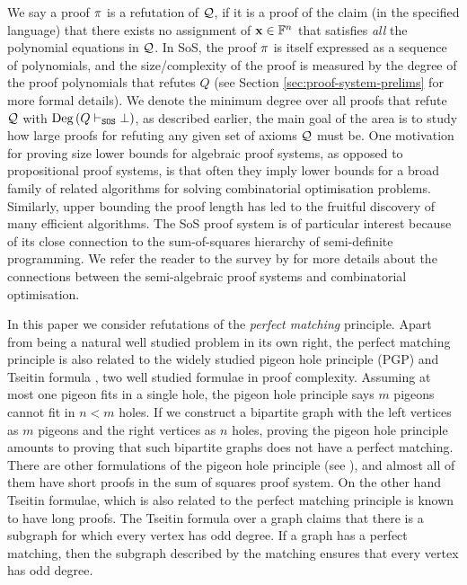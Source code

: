\documentclass[11pt]{article}
\begin{document}
We say a proof $\pi$ is a refutation of $\mathcal{Q}$, if it is a proof of the claim (in the specified language) that there exists no assignment of $\mathbf{x} \in \mathbb{F}^n$ that satisfies \emph{all} the polynomial equations in $\mathcal{Q}$.
In SoS, the proof $\pi$ is itself expressed as a sequence of polynomials, and the size/complexity of the proof is measured by the degree of the proof polynomials that refutes $Q$ (see Section \ref{sec:proof-system-prelims} for more formal details).
We denote the minimum degree over all proofs that refute $\mathcal{Q}$ with $\text{Deg}\left(Q \vdash_{\texttt{SOS}} \bot\right)$, as described earlier, the main goal of the area is to study how large proofs for refuting any given set of axioms $\mathcal{Q}$ must be.
One motivation for proving size lower bounds for algebraic proof systems, as opposed to propositional proof systems, is that often they imply lower bounds for a broad family of related algorithms for solving combinatorial optimisation problems.
Similarly, upper bounding the proof length has led to the fruitful discovery of many efficient algorithms.
The SoS proof system is of particular interest because of its close connection to the sum-of-squares hierarchy of semi-definite programming.
We refer the reader to the survey by \citet{fleming2019semialgebraic} for more details about the connections between the semi-algebraic proof systems and combinatorial optimisation.\par
In this paper we consider refutations of the \emph{perfect matching} principle.
Apart from being a natural well studied problem in its own right, the perfect matching principle is also related to the widely studied pigeon hole principle (PGP) \citep{razbarov2002pgp} and Tseitin formula \citep{grigoriev2001linear}, two well studied formulae in proof complexity.
Assuming at most one pigeon fits in a single hole, the pigeon hole principle says $m$ pigeons cannot fit in $n < m$ holes.
If we construct a bipartite graph with the left vertices as $m$ pigeons and the right vertices as $n$ holes, proving the pigeon hole principle amounts to proving that such bipartite graphs does not have a perfect matching.
There are other formulations of the pigeon hole principle (see \citep{razbarov2002pgp}), and almost all of them have short proofs in the sum of squares proof system.
On the other hand Tseitin formulae, which is also related to the perfect matching principle is known to have long proofs.
The Tseitin formula over a graph claims that there is a subgraph for which every vertex has odd degree.
If a graph has a perfect matching, then the subgraph described by the matching ensures that every vertex has odd degree.
\end{document}
